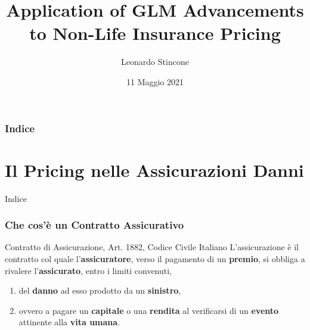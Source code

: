 \documentclass[pdf, aspectratio=169, xcolor=dvipsnames]{beamer}\usepackage[]{graphicx}\usepackage[]{color}
\title{Application of GLM Advancements \\ to Non-Life Insurance Pricing}
\author{Leonardo Stincone}
\date{11 Maggio 2021}
\institute[units]{Università degli Studi di Trieste}
\theoremstyle{definition}
\begin{document}
\begin{frame}
\titlepage
\end{frame}



\begin{frame}
\frametitle{Indice}

\tableofcontents


\end{frame}


\section{Il Pricing nelle Assicurazioni Danni}

\begin{frame}{Indice}
  \tableofcontents[currentsection]
\end{frame}


\begin{frame}
\frametitle{Che cos'è un Contratto Assicurativo}

\begin{block}{Contratto di Assicurazione, Art. 1882, Codice Civile Italiano}
  L'assicurazione è il contratto col quale l'{\bfseries assicuratore}, verso il pagamento di un {\bfseries premio}, si obbliga a rivalere l'{\bfseries assicurato}, entro i limiti convenuti,
  
  \begin{enumerate}
    \item del {\bfseries danno} ad esso prodotto da un {\bfseries sinistro},
    \item ovvero a pagare un {\bfseries capitale} o una {\bfseries rendita} al verificarsi di un {\bfseries evento} attinente alla {\bfseries vita umana}.
  \end{enumerate}
\end{block}

\end{frame}
\end{document}
